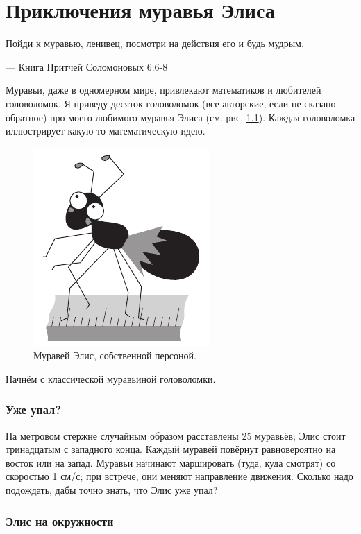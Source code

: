 \chapter{Приключения муравья Элиса}


\setlength{\epigraphwidth}{.67\textwidth}
\epigraph{Пойди к муравью, ленивец, посмотри на действия его и будь мудрым.
}{--- Книга Притчей Соломоновых 6:6-8} 

Муравьи, даже в одномерном мире, привлекают математиков и любителей головоломок.
Я приведу десяток головоломок (все авторские, если не сказано обратное) про моего любимого муравья Элиса
(см. рис. \ref{pic:alice1}).
Каждая головоломка иллюстрирует какую-то математическую идею.

\begin{figure}[ht!]
\centering
\includegraphics[scale=.7]{pics/alice1}
\caption{Муравей Элис, собственной персоной.}
\label{pic:alice1}
\end{figure}

Начнём с классической муравьиной головоломки.

\subsection*{Уже упал?}\label{Уже упал?}

На метровом стержне случайным образом расставлены 25 муравьёв; Элис стоит тринадцатым с западного конца.
Каждый муравей повёрнут равновероятно на восток или на запад.
Муравьи начинают маршировать (туда, куда смотрят) со скоростью 1 см/с;
при встрече, они меняют направление движения.
Сколько надо подождать, дабы точно знать, что Элис уже упал?

\subsection*{Элис на окружности}\label{Элис на окружности}

